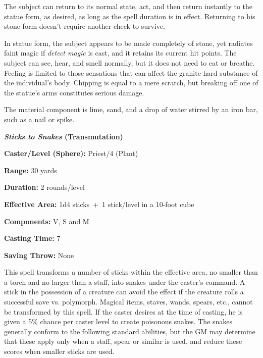 \begin{multicols}{2}
The subject can return to its normal state, act, and then return instantly to the statue form, as desired, as long as the spell duration is in effect.  Returning to his stone form doesn't require another check to survive.

In statue form, the subject appears to be made completely of stone, yet radiates faint magic if \textit{detect magic} is cast, and it retains its current hit points.  The subject can see, hear, and smell normally, but it does not need to eat or breathe.  Feeling is limited to those sensations that can affect the granite-hard substance of the individual's body. Chipping is equal to a mere scratch, but breaking off one of the statue's arms constitutes serious damage. 

The material component is lime, sand, and a drop of water stirred by an iron bar, such as a nail or spike.

\vspace{1em}

\noindent
\begin{minipage}{\columnwidth}

\noindent \textbf{\textit{Sticks to Snakes} (Transmutation)}

\noindent \textbf{Caster/Level (Sphere):} Priest/4 (Plant)

\noindent \textbf{Range:} 30 yards

\noindent \textbf{Duration:} 2 rounds/level

\noindent \textbf{Effective Area:} 1d4 sticks~+~1 stick/level in a 10-foot cube

\noindent \textbf{Components:} V, S and M

\noindent \textbf{Casting Time:} 7

\noindent \textbf{Saving Throw:} None

\end{minipage}

This spell transforms a number of sticks within the effective area, no smaller than a torch and no larger than a staff, into snakes under the caster's command.  A stick in the possession of a creature can avoid the effect if the creature rolls a successful save vs. polymorph.  Magical items, staves, wands, spears, etc., cannot be transformed by this spell.  If the caster desires at the time of casting, he is given a 5\% chance per caster level to create poisonous snakes.  The snakes generally conform to the following standard abilities, but the GM may determine that these apply only when a staff, spear or similar is used, and reduce these scores when smaller sticks are used.
 

\end{multicols}
